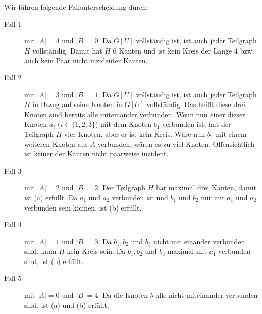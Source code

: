     Wir führen folgende Fallunterscheidung durch:
    \begin{description}
    	\item[Fall 1] mit $|A|=4$ und $|B|=0$. Da $G[U]$ vollständig ist, ist auch jeder Teilgraph $H$ vollständig. 
        Damit hat $H$ 6 Kanten und ist kein Kreis der Länge $4$ bzw. auch kein Paar nicht inzidenter Kanten.
    	\item[Fall 2] mit $|A|=3$ und $|B|=1$. Da $G[U]$ vollständig ist, ist auch jeder Teilgraph $H$ in Bezug auf 
        seine Knoten in $G[U]$ vollständig. Das heißt diese drei Knoten sind bereits alle miteinander verbunden. Wenn 
        nun einer dieser Knoten $a_i$ ($i \in \{1,2,3\})$ mit dem Knoten $b_1$ verbunden ist, hat der Teilgraph $H$ 
        vier Knoten, aber er ist kein Kreis. Wäre nun $b_1$ mit einem weiteren Knoten aus $A$ verbunden, wären es zu 
        viel Knoten. Offensichtlich ist keiner der Kanten nicht paarweise inzident.
    	\item[Fall 3] mit  $|A|=2$ und $|B|=2$. Der Teilgraph $H$ hat maximal drei Kanten, damit ist (a) erfüllt. 
        Da $a_1$ und $a_2$ verbunden ist und $b_1$ und $b_2$ nur mit $a_1$ und $a_2$ verbunden sein können, ist (b)
        erfüllt.
    	\item[Fall 4] mit  $|A|=1$ und $|B|=3$. Da $b_1, b_2$ und $b_3$ nicht mit einander verbunden sind, kann $H$ kein 
        Kreis sein.  Da $b_1, b_2$ und $b_3$ maximal mit $a_1$ verbunden sind, ist (b) erfüllt.
    	\item[Fall 5] mit  $|A|=0$ und $|B|=4$. Da die Knoten $b$ alle nicht miteinander verbunden sind, ist (a) und (b)
        erfüllt.
    \end{description}
    

